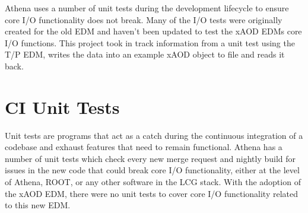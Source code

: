 Athena uses a number of unit tests during the development lifecycle to ensure core I/O functionality does not break.
Many of the I/O tests were originally created for the old EDM and haven't been updated to test the xAOD EDMs core I/O functions.
This project took in track information from a unit test using the T/P EDM, writes the data into an example xAOD object to file and reads it back.

\section{CI Unit Tests}
Unit tests are programs that act as a catch during the continuous integration of a codebase and exhaust features that need to remain functional. 
Athena has a number of unit tests which check every new merge request and nightly build for issues in the new code that could break core I/O functionality, either at the level of Athena, ROOT, or any other software in the LCG stack.
With the adoption of the xAOD EDM, there were no unit tests to cover core I/O functionality related to this new EDM. 

